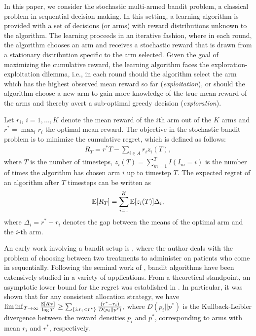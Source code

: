 In this paper, we consider the stochastic multi-armed bandit problem, a classical problem in sequential decision making. In this setting,  a learning algorithm is provided with a set of decisions (or arms) with reward distributions unknown to the algorithm. The learning proceeds in an iterative fashion, where in each round, the algorithm chooses an arm and receives a stochastic reward that is drawn from a stationary distribution specific to the arm selected.  
Given the goal of maximizing the cumulative reward, the learning algorithm faces the exploration-exploitation dilemma, i.e., in each round should the algorithm select the arm which has the highest observed mean reward so far 
(\textit{exploitation}), or should the algorithm choose a new arm to gain more knowledge of the true mean reward of the arms and thereby avert a sub-optimal greedy decision (\textit{exploration}). 

Let $r_i$, $i=1,\ldots,K$ denote the mean reward of the $i$th arm out of the $K$ arms and $r^* = \max_i r_i$ the optimal mean reward. The objective in the stochastic bandit problem is to minimize the cumulative regret, which is defined as follows:
\begin{align*}
R_{T}=r^{*}T - \sum_{i\in A} r_{i}z_{i}(T),
\end{align*}
where $T$ is the number of timesteps, $z_{i}(T)=\sum_{m=1}^T I(I_m=i)$ is the number of times the algorithm has chosen arm $i$ up to timestep $T$.
The expected regret of an algorithm after $T$ timesteps can be written as
\begin{align*}
\mathbb{E}[R_{T}]= \sum_{i=1}^K \mathbb{E}[z_i(T)] \Delta_i,
\end{align*}
where $\Delta_{i}=r^{*}-r_{i}$ denotes the gap between the means of the optimal arm and the $i$-th arm. 


                                                                                                                                          


An early work involving a bandit setup is \citet{thompson1933likelihood}, where the author deals with  the problem of choosing between two treatments to administer on patients who come in sequentially. Following the seminal work of \citet{robbins1952some}, bandit algorithms have been extensively studied in a variety of applications. 
From a theoretical standpoint, an asymptotic lower bound for the regret was established in \citet{lai1985asymptotically}. In particular, it was shown that for any consistent allocation strategy, we have
$\liminf_{T \to \infty}\frac{\mathbb{E}[R_{T}]}{\log T}\geq\sum_{\{i:r_{i}<r^{*}\}}\frac{(r^{*}-r_{i})}{D(p_{i}||p^{*})},$
where $D(p_{i}||p^{*})$ is the Kullback-Leibler divergence between the reward densities $p_{i}$ and $p^{*}$, corresponding to arms with mean $r_{i}$ and $r^{*}$, respectively.

